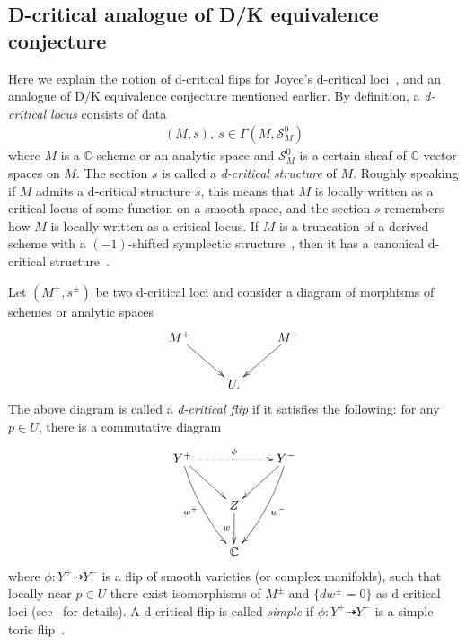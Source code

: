 \documentclass[11pt]{amsart}
\theoremstyle{plain}
\newcommand{\sS}{\mathcal{S}}
\begin{document}
\subsection{D-critical analogue of D/K equivalence conjecture}\label{subsec:intro:dcrit}
Here we explain the notion of 
d-critical flips 
for Joyce's d-critical loci~\cite{JoyceD}, 
and an analogue of D/K equivalence conjecture 
mentioned earlier. 
By definition, a \textit{d-critical locus} 
 consists of data
\begin{align*}
(M, s), \ s \in \Gamma(M, \sS_{M}^0)
\end{align*} where 
$M$ is a $\mathbb{C}$-scheme or an analytic space and 
$\sS_M^0$ is a certain sheaf of $\mathbb{C}$-vector spaces
on $M$. 
The section $s$ is called a \textit{d-critical structure} of $M$. 
Roughly speaking
if $M$ admits a d-critical structure $s$, 
this means that $M$ is locally written as a critical 
locus of some function on a smooth space, and the section 
$s$ remembers how $M$ is locally written as a critical locus. 
If $M$ is a truncation of a derived scheme with a $(-1)$-shifted 
symplectic structure~\cite{PTVV}, then 
it has a canonical d-critical structure~\cite{BBBJ}. 

Let $(M^{\pm}, s^{\pm})$
be two d-critical loci and consider a diagram
of morphisms of schemes or analytic spaces
\begin{align}\label{intro:dcrit}
\xymatrix{
M^{+} \ar[rd] & & M^{-} \ar[ld] \\
& U. &
}
\end{align}
The above diagram is called a
\textit{d-critical flip} 
if it satisfies the following: 
for any
$p \in U$, there is a commutative diagram 
\begin{align}\label{intro:dcrit2}
\xymatrix{
Y^{+} \ar[rd] 
\ar@/_5pt/[rdd]_-{w^{+}}  \ar@{.>}[rr]^-{\phi}& & Y^{-} \ar[ld] 
\ar@/^5pt/[ldd]^-{w^-}\\
& Z \ar[d]_-{w} &  \\
& \mathbb{C} &
}
\end{align}
where $ \phi \colon Y^{+} \dashrightarrow Y^{-}$ is a flip 
of smooth varieties (or complex manifolds), 
such that locally near $p\in U$
there exist isomorphisms of 
$M^{\pm}$ and $\{dw^{\pm}=0\}$ as d-critical loci
(see~\cite[Definition~3.7]{Todbir} for details).
A d-critical flip is called \textit{simple}
if $\phi \colon Y^+ \dashrightarrow Y^-$ is a 
simple toric flip~\cite{Rei92}. 
\end{document}
